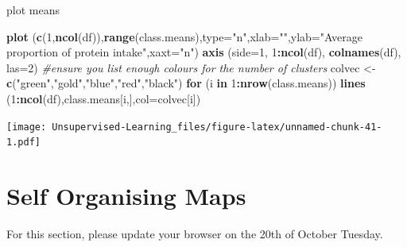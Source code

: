 \documentclass[
]{book}
\newenvironment{Shaded}{\begin{snugshade}}{\end{snugshade}}
\newcommand{\CommentTok}[1]{\textcolor[rgb]{0.56,0.35,0.01}{\textit{#1}}}
\newcommand{\ControlFlowTok}[1]{\textcolor[rgb]{0.13,0.29,0.53}{\textbf{#1}}}
\newcommand{\DataTypeTok}[1]{\textcolor[rgb]{0.13,0.29,0.53}{#1}}
\newcommand{\DecValTok}[1]{\textcolor[rgb]{0.00,0.00,0.81}{#1}}
\newcommand{\KeywordTok}[1]{\textcolor[rgb]{0.13,0.29,0.53}{\textbf{#1}}}
\newcommand{\NormalTok}[1]{#1}
\newcommand{\OperatorTok}[1]{\textcolor[rgb]{0.81,0.36,0.00}{\textbf{#1}}}
\newcommand{\StringTok}[1]{\textcolor[rgb]{0.31,0.60,0.02}{#1}}
\begin{document}
plot means

\begin{Shaded}
\begin{Highlighting}[]
\KeywordTok{plot}\NormalTok{ (}\KeywordTok{c}\NormalTok{(}\DecValTok{1}\NormalTok{,}\KeywordTok{ncol}\NormalTok{(df)),}\KeywordTok{range}\NormalTok{(class.means),}\DataTypeTok{type=}\StringTok{"n"}\NormalTok{,}\DataTypeTok{xlab=}\StringTok{""}\NormalTok{,}\DataTypeTok{ylab=}\StringTok{"Average proportion of protein intake"}\NormalTok{,}\DataTypeTok{xaxt=}\StringTok{"n"}\NormalTok{)}
\KeywordTok{axis}\NormalTok{ (}\DataTypeTok{side=}\DecValTok{1}\NormalTok{, }\DecValTok{1}\OperatorTok{:}\KeywordTok{ncol}\NormalTok{(df), }\KeywordTok{colnames}\NormalTok{(df), }\DataTypeTok{las=}\DecValTok{2}\NormalTok{)}
\CommentTok{#ensure you list enough colours for the number of clusters}
\NormalTok{colvec <-}\StringTok{ }\KeywordTok{c}\NormalTok{(}\StringTok{"green"}\NormalTok{,}\StringTok{"gold"}\NormalTok{,}\StringTok{"blue"}\NormalTok{,}\StringTok{"red"}\NormalTok{,}\StringTok{"black"}\NormalTok{)}
\ControlFlowTok{for}\NormalTok{ (i }\ControlFlowTok{in} \DecValTok{1}\OperatorTok{:}\KeywordTok{nrow}\NormalTok{(class.means))}
  \KeywordTok{lines}\NormalTok{ (}\DecValTok{1}\OperatorTok{:}\KeywordTok{ncol}\NormalTok{(df),class.means[i,],}\DataTypeTok{col=}\NormalTok{colvec[i])}
\end{Highlighting}
\end{Shaded}

\texttt{[image: Unsupervised-Learning\_files/figure-latex/unnamed-chunk-41-1.pdf]}

\hypertarget{self-organising-maps}{%
\chapter{Self Organising Maps}\label{self-organising-maps}}

For this section, please update your browser on the 20th of October Tuesday.

  
\end{document}
